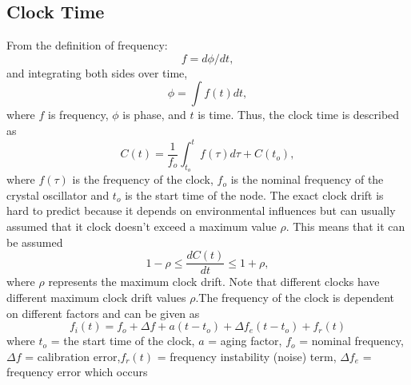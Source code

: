 \documentclass[journal]{IEEEtran}
\begin{document}
\subsection{\textbf{Clock Time}}
\noindent From the definition of frequency:
\begin{equation}
f = d\phi/dt \label{freq_defn} ,
\end{equation}
and integrating both sides over time,
 \begin{equation}
\phi =\int f(t)dt ,
 \end{equation}
where $f$ is frequency, $\phi$ is phase, and $t$ is time.\newline
Thus, the clock time is described as
\begin{equation}
C(t) = \frac{1}{f_o}\int_{t_o}^{t} {f(\tau)d\tau} + C(t_o) ,
\label{clock}
\end{equation}
where $f(\tau)$ is the frequency of the clock, $f_o$ is the nominal frequency of the crystal oscillator and $t_o$ is the start time of the node. \newline The exact clock drift is hard to predict because it depends on environmental influences but can usually assumed that it clock doesn't exceed a maximum value $\rho$. This means that it can be assumed
\begin{equation}
1-\rho \leq \frac{dC(t)}{dt} \leq 1+\rho ,
\end{equation}
where $\rho$ represents the maximum clock drift. Note that different clocks have different maximum clock drift values $\rho$.\newline The frequency of the clock is dependent on different
factors and can be given as
\begin{equation}
f_i(t) = f_o + \Delta f + a(t-t_o) + \Delta
f_e(t-t_o) + f_r(t) \label{frequency}
\end{equation}
where \newline $t_o$ = the start time of the clock, \newline $a$ = aging factor,  \newline $f_o$ = nominal frequency, \newline $\Delta
f$ = calibration error,\newline $f_r(t)$ = frequency instability (noise) term, \newline $\Delta f_e$ = frequency error which occurs
\end{document}
